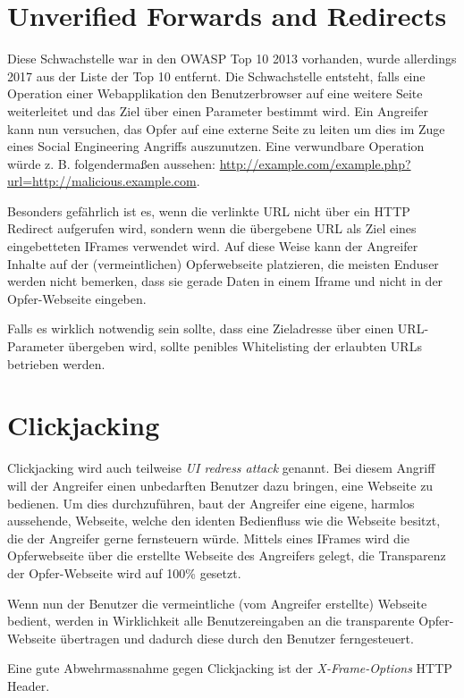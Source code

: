 \section{Unverified Forwards and Redirects}

Diese Schwachstelle war in den OWASP Top 10 2013 vorhanden, wurde allerdings 2017 aus der Liste der Top 10 entfernt. Die Schwachstelle entsteht, falls eine Operation einer Webapplikation den Benutzerbrowser auf eine weitere Seite weiterleitet und das Ziel über einen Parameter bestimmt wird. Ein Angreifer kann nun versuchen, das Opfer auf eine externe Seite zu leiten um dies im Zuge eines Social Engineering Angriffs auszunutzen. Eine verwundbare Operation würde z. B. folgendermaßen aussehen: \url{http://example.com/example.php?url=http://malicious.example.com}.

Besonders gefährlich ist es, wenn die verlinkte URL nicht über ein HTTP Redirect aufgerufen wird, sondern wenn die übergebene URL als Ziel eines eingebetteten IFrames verwendet wird. Auf diese Weise kann der Angreifer Inhalte auf der (vermeintlichen) Opferwebseite platzieren, die meisten Enduser werden nicht bemerken, dass sie gerade Daten in einem Iframe und nicht in der Opfer-Webseite eingeben.

Falls es wirklich notwendig sein sollte, dass eine Zieladresse über einen URL-Parameter übergeben wird, sollte penibles Whitelisting der erlaubten URLs betrieben werden.

\section{Clickjacking}

Clickjacking wird auch teilweise \textit{UI redress attack} genannt. Bei diesem Angriff will der Angreifer einen unbedarften Benutzer dazu bringen, eine Webseite zu bedienen. Um dies durchzuführen, baut der Angreifer eine eigene, harmlos aussehende, Webseite, welche den identen Bedienfluss wie die Webseite besitzt, die der Angreifer gerne fernsteuern würde. Mittels eines IFrames wird die Opferwebseite über die erstellte Webseite des Angreifers gelegt, die Transparenz der Opfer-Webseite wird auf 100\% gesetzt.

Wenn nun der Benutzer die vermeintliche (vom Angreifer erstellte) Webseite bedient, werden in Wirklichkeit alle Benutzereingaben an die transparente Opfer-Webseite übertragen und dadurch diese durch den Benutzer ferngesteuert.

Eine gute Abwehrmassnahme gegen Clickjacking ist der \textit{X-Frame-Options} HTTP Header.

